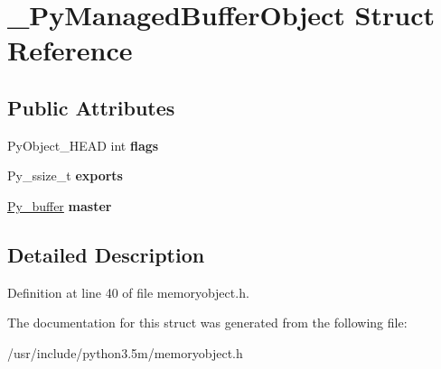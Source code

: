 \hypertarget{struct__PyManagedBufferObject}{}\section{\+\_\+\+Py\+Managed\+Buffer\+Object Struct Reference}
\label{struct__PyManagedBufferObject}
\subsection*{Public Attributes}
\begin{DoxyCompactItemize}
\item 
Py\+Object\+\_\+\+H\+E\+AD int {\bfseries flags}\hypertarget{struct__PyManagedBufferObject_ae82b7eab672b4197a408e4d530aa72c3}{}\label{struct__PyManagedBufferObject_ae82b7eab672b4197a408e4d530aa72c3}

\item 
Py\+\_\+ssize\+\_\+t {\bfseries exports}\hypertarget{struct__PyManagedBufferObject_a3eb95ffd02865d164baaa08657a840e3}{}\label{struct__PyManagedBufferObject_a3eb95ffd02865d164baaa08657a840e3}

\item 
\hyperlink{structbufferinfo}{Py\+\_\+buffer} {\bfseries master}\hypertarget{struct__PyManagedBufferObject_a2eebafab6d399b7b007cbd4f5dfe3897}{}\label{struct__PyManagedBufferObject_a2eebafab6d399b7b007cbd4f5dfe3897}

\end{DoxyCompactItemize}


\subsection{Detailed Description}


Definition at line 40 of file memoryobject.\+h.



The documentation for this struct was generated from the following file\+:\begin{DoxyCompactItemize}
\item 
/usr/include/python3.\+5m/memoryobject.\+h\end{DoxyCompactItemize}
